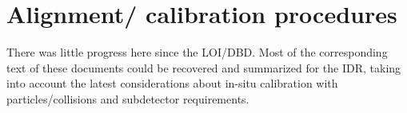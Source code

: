 \section{Alignment/ calibration procedures}

There was little progress here since the LOI/DBD. Most of the corresponding text of these documents could be recovered and summarized for the IDR, taking into account the latest considerations about in-situ calibration with particles/collisions and subdetector requirements.

\vspace{2cm}
